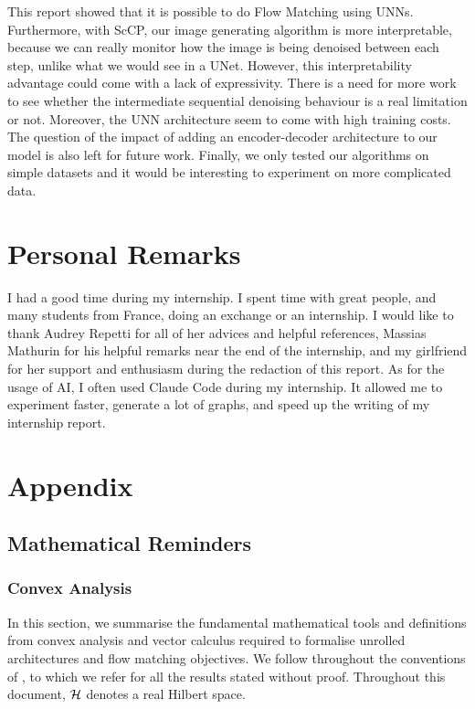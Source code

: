 \documentclass[a4paper,11pt]{article}
\theoremstyle{plain}{\theorembodyfont{\rmfamily}%
\newtheorem{proposition}[theorem]{Proposition}}
\theoremstyle{plain}{\theorembodyfont{\rmfamily}%
\newtheorem{notation}[theorem]{Notation}}
\theoremstyle{plain}{\theorembodyfont{\rmfamily}%
\newtheorem{assumption}[theorem]{Assumption}}
\theoremstyle{plain}{\theorembodyfont{\rmfamily}%
\newtheorem{problem}[theorem]{Problem}}
\theoremstyle{plain}{\theorembodyfont{\rmfamily}%
\newtheorem{example}[theorem]{Example}}
\theoremstyle{plain}{\theorembodyfont{\rmfamily}%
\newtheorem{remark}[theorem]{Remark}}
\theoremstyle{plain}{\theorembodyfont{\rmfamily}%
\newtheorem{definition}[theorem]{Definition}}
\theoremstyle{plain}{\theorembodyfont{\rmfamily}%
\newtheorem{question}[theorem]{Question}}
\numberwithin{equation}{section}
\begin{document}
This report showed that it is possible to do Flow Matching using UNNs. Furthermore, with ScCP, our image generating algorithm is more interpretable, because we can really monitor how the image is being denoised between each step, unlike what we would see in a UNet. However, this interpretability advantage could come with a lack of expressivity. There is a need for more work to see whether the intermediate sequential denoising behaviour is a real limitation or not. Moreover, the UNN architecture seem to come with high training costs. The question of the impact of adding an encoder-decoder architecture to our model is also left for future work. Finally, we only tested our algorithms on simple datasets and it would be interesting to experiment on more complicated data.

\section{Personal Remarks}

I had a good time during my internship. I spent time with great people, and many students from France, doing an exchange or an internship. I would like to thank Audrey Repetti for all of her advices and helpful references, Massias Mathurin for his helpful remarks near the end of the internship, and my girlfriend for her support and enthusiasm during the redaction of this report. As for the usage of AI, I often used Claude Code during my internship. It allowed me to experiment faster, generate a lot of graphs, and speed up the writing of my internship report.

\small
{}


\section{Appendix}

\subsection{Mathematical Reminders}
\label{subsec:mathematical_reminders}

\subsubsection{Convex Analysis}

In this section, we summarise the fundamental mathematical tools and definitions from convex analysis and vector calculus required to formalise unrolled architectures and flow matching objectives. We follow throughout the conventions of \cite{bauschke2017convex}, to which we refer for all the results stated without proof. Throughout this document, ${\mathcal{H}}$ denotes a real Hilbert space.
\end{document}
